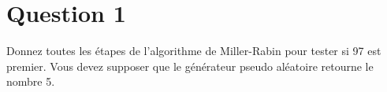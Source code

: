 \documentclass[devoir4.tex]{subfiles}
\begin{document}
\section*{Question 1}
Donnez toutes les étapes de l'algorithme de Miller-Rabin pour tester si 97 est premier. Vous devez supposer que le générateur pseudo aléatoire retourne le nombre 5.
\end{document}
